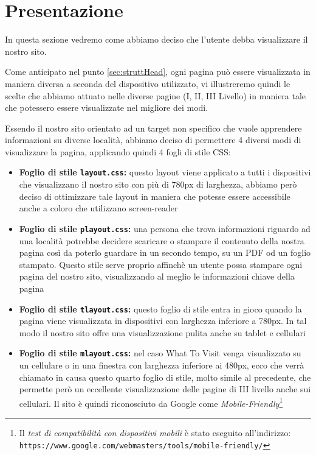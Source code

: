 \section{Presentazione}\label{sec:presentazione}
In questa sezione vedremo come abbiamo deciso che l'utente debba visualizzare
il nostro sito.

Come anticipato nel punto \ref{sec:struttHead}, ogni pagina può essere
visualizzata in maniera diversa a seconda del dispositivo utilizzato, vi
illustreremo quindi le scelte che abbiamo attuato nelle diverse pagine (I, II,
III Livello) in maniera tale che potessero essere visualizzate nel migliore
dei modi.

Essendo il nostro sito orientato ad un target non specifico che vuole
apprendere informazioni su diverse località, abbiamo deciso di permettere 4
diversi modi di visualizzare la pagina, applicando quindi 4 fogli di stile CSS:
\begin{itemize}
\item \textbf{Foglio di stile \texttt{layout.css}:} questo layout viene
applicato a tutti i dispositivi che visualizzano il nostro sito con più di
780px di larghezza, abbiamo però deciso di ottimizzare tale layout in maniera
che potesse essere accessibile anche a coloro che utilizzano screen-reader
\item \textbf{Foglio di stile \texttt{playout.css}:} una persona che trova
informazioni riguardo ad una località potrebbe decidere scaricare o stampare
il contenuto della nostra pagina così da poterlo guardare in un secondo tempo,
su un PDF od un foglio stampato. Questo stile serve proprio affinchè un utente
possa stampare ogni pagina del nostro sito, visualizzando al meglio le
informazioni chiave della pagina
\item \textbf{Foglio di stile \texttt{tlayout.css}:} questo foglio di stile
entra in gioco quando la pagina viene visualizzata in dispositivi con larghezza
inferiore a 780px. In tal modo il nostro sito offre una visualizzazione pulita
anche su tablet e cellulari
\item \textbf{Foglio di stile \texttt{mlayout.css}:} nel caso What To Visit
venga visualizzato su un cellulare o in una finestra con larghezza inferiore ai
480px, ecco che verrà chiamato in causa questo quarto foglio di stile, molto
simile al precedente, che permette però un eccellente visualizzazione delle
pagine di III livello anche sui cellulari. Il sito è quindi riconosciuto da
Google come \textit{Mobile-Friendly}\footnote{Il \textit{test di compatibilità
con dispositivi mobili} è stato eseguito all'indirizzo:
\texttt{https://www.google.com/webmasters/tools/mobile-friendly/}}
\end{itemize}

